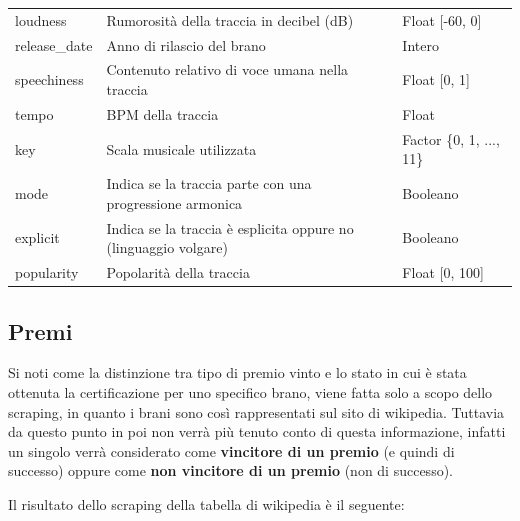 \begin{center}
{\begin{tabular}[H]{ |l|l|l| }
			loudness & 
			Rumorosità della traccia in decibel (dB) &
			Float [-60, 0]\\
			
			release\_date & 
			Anno di rilascio del brano&
			Intero\\
			
			speechiness & 
			Contenuto relativo di voce umana nella traccia &
			Float [0, 1]\\
			
			tempo & 
			BPM della traccia &
			Float\\
			
			key & 
			Scala musicale utilizzata &
			Factor \{0, 1, ..., 11\}\\
			
			mode & 
			Indica se la traccia parte con una progressione armonica &
			Booleano\\
			
			explicit & 
			Indica se la traccia è esplicita oppure no (linguaggio volgare) &
			Booleano\\
			
			popularity & 
			Popolarità della traccia &
			Float [0, 100]\\
			
			\hline
			
		\end{tabular}
	}
\end{center}



\subsection{Premi}
Si noti come la distinzione tra tipo di premio vinto e lo stato in cui è stata ottenuta la certificazione per uno specifico brano, viene fatta solo a scopo dello scraping, in quanto i brani sono così rappresentati sul sito di wikipedia. Tuttavia da questo punto in poi non verrà più tenuto conto di questa informazione, infatti un singolo verrà considerato come\textbf{ vincitore di un premio} (e quindi di successo) oppure come \textbf{non vincitore di un premio} (non di successo). 

Il risultato dello scraping della tabella di wikipedia è il seguente:


